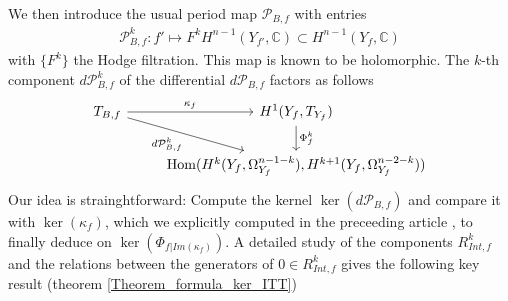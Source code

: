 \documentclass[12pt, english]{article}
\DeclareMathOperator{\Hom}{Hom}
\begin{document}

We then introduce the usual period map $\mathcal{P}_{B,f}$ with entries
\begin{align*}
	\mathcal{P}_{B,f}^k: f' \mapsto F^{k}H^{n-1}(Y_{f'},\mathbb{C}) \subset H^{n-1}(Y_f,\mathbb{C})
\end{align*}
with $\{ F^k \}$ the Hodge filtration. This map is known to be holomorphic. The $k$-th component $d \mathcal{P}_{B,f}^k$ of the differential $d \mathcal{P}_{B,f}$ factors as follows
\begin{equation}
	\begin{tikzcd} \label{Commutative_diagram_Kodaira_Spencer_map_dP_intro}
		T_{B,f}  \arrow[swap]{dr}{d \mathcal{P}_{B,f}^k } \arrow{r}{\kappa_{f}} & H^{1}(Y_f,T_{Y_f})  \arrow{d}{\Phi_f^k} \\
		& \Hom(H^{k}(Y_f, \Omega_{Y_f}^{n-1-k}), H^{k+1}(Y_f, \Omega_{Y_f}^{n-2-k}))
	\end{tikzcd}
\end{equation}
Our idea is strainghtforward: Compute the kernel $\ker(d \mathcal{P}_{B,f})$ and compare it with $\ker(\kappa_f)$, which we explicitly computed in the preceeding article \cite{Gie22}, to finally deduce on $\ker(\Phi_{f \vert{Im(\kappa_f)}})$. A detailed study of the components $R_{Int,f}^k$ and the relations between the generators of $0 \in R_{Int,f}^k$ gives the following key result (theorem \ref{Theorem_formula_ker_ITT})
\end{document}
